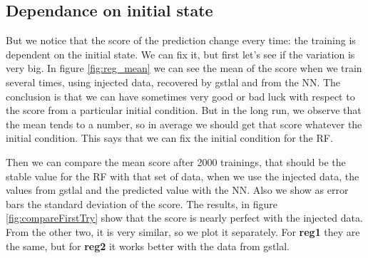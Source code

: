 \documentclass[prd,aps,twocolumn,a4paper,showkeys,nofootinbib]{revtex4-2}
\begin{document}
\subsection{Dependance on initial state}
But we notice that the score of the prediction change every time: the training is dependent on the initial state. We can fix it, but first let's see if the variation is very big. In figure \ref{fig:reg_mean} we can see the mean of the score when we train several times, using injected data, recovered by gstlal and from the NN. The conclusion is that we can have sometimes very good or bad luck with respect to the score from a particular initial condition. But in the long run, we observe that the mean tends to a number, so in average we should get that score whatever the initial condition. This says that we can fix the initial condition for the RF.

Then we can compare the mean score after 2000 trainings, that should be the stable value for the RF with that set of data, when we use the injected data, the values from gstlal and the predicted value with the NN. Also we show as error bars the standard deviation of the score. The results, in figure \ref{fig:compareFirstTry} show that the score is nearly perfect with the injected data. From the other two, it is very similar, so we plot it separately. For \textbf{reg1} they are the same, but for \textbf{reg2} it works better with the data from gstlal.
\end{document}
